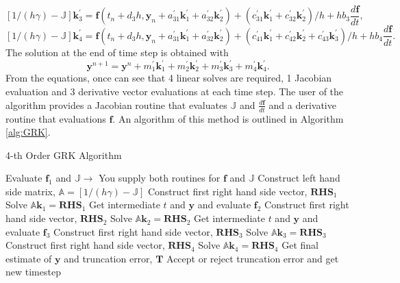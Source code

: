 \documentclass{ansconf}
\numberwithin{equation}{section}
\begin{document}
\begin{equation}
    \left[1/\left(h\gamma\right) - \mathbb{J}\right]\mathbf{k}^\prime_3 = \mathbf{f}\left(t_n + d_3h, \mathbf{y}_n + a^\prime_{31}\mathbf{k}^\prime_1 + a^\prime_{32}\mathbf{k}^\prime_2\right) + \left(c^\prime_{31}\mathbf{k}^\prime_1 + c^\prime_{32}\mathbf{k}^\prime_2\right)/h + hb_3\frac{d\mathbf{f}}{dt},
\end{equation}
\begin{equation}
    \left[1/\left(h\gamma\right) - \mathbb{J}\right]\mathbf{k}^\prime_4 = \mathbf{f}\left(t_n + d_3h, \mathbf{y}_n + a^\prime_{31}\mathbf{k}^\prime_1 + a^\prime_{32}\mathbf{k}^\prime_2\right) + \left(c^\prime_{41}\mathbf{k}^\prime_1 + c^\prime_{42}\mathbf{k}^\prime_2 + c^\prime_{43}\mathbf{k}^\prime_3\right)/h + hb_4\frac{d\mathbf{f}}{dt}.
\end{equation}
The solution at the end of time step is obtained with
\begin{equation}
   \mathbf{y}^{n+1} = \mathbf{y}^n + m^\prime_1\mathbf{k}^\prime_1 + m^\prime_2\mathbf{k}^\prime_2 + m^\prime_3\mathbf{k}^\prime_3 + m^\prime_4\mathbf{k}^\prime_4.
\end{equation}
From the equations, once can see that 4 linear solves are required, 1 Jacobian evaluation and 3 derivative vector evaluations at each time step. The user of the algorithm provides a Jacobian routine that evaluates $\mathbb{J}$ and $\frac{d\mathbf{f}}{dt}$ and a derivative routine that evaluations $\mathbf{f}$. An algorithm of this method is outlined in Algorithm \ref{alg:GRK}.
\begin{algorithm}
\centering
\caption{4-th Order GRK Algorithm}
\label{alg:GRK}
\begin{algorithmic}[1]
  \State Evaluate $\mathbf{f}_1$ and $\mathbb{J}\rightarrow$ {\color{red}You supply both routines for $\mathbf{f}$ and $\mathbb{J}$}
    \State Construct left hand side matrix, $\mathbb{A} = \left[1/\left(h\gamma\right) - \mathbb{J}\right]$
    \State Construct first right hand side vector, $\mathbf{RHS}_1$
    \State Solve $\mathbb{A}\mathbf{k}_1=\mathbf{RHS}_1$
    \State Get intermediate $t$ and $\mathbf{y}$ and evaluate $\mathbf{f}_2$
    \State Construct first right hand side vector, $\mathbf{RHS}_2$
    \State Solve $\mathbb{A}\mathbf{k}_2=\mathbf{RHS}_2$
    \State Get intermediate $t$ and $\mathbf{y}$ and evaluate $\mathbf{f}_3$
    \State Construct first right hand side vector, $\mathbf{RHS}_3$
    \State Solve $\mathbb{A}\mathbf{k}_3=\mathbf{RHS}_3$
    \State Construct first right hand side vector, $\mathbf{RHS}_4$
    \State Solve $\mathbb{A}\mathbf{k}_4=\mathbf{RHS}_4$
    \State Get final estimate of $\mathbf{y}$ and truncation error, $\mathbf{T}$
    \State Accept or reject truncation error and get new timestep
  \EndFor
\end{algorithmic}
\end{algorithm}
\end{document}
